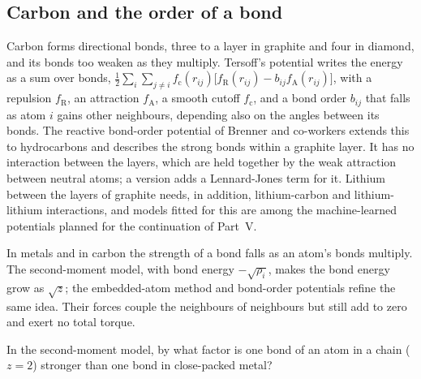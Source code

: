 \subsection*{Carbon and the order of a bond}

Carbon forms directional bonds, three to a layer in graphite and four in
diamond, and its bonds too weaken as they multiply. Tersoff's potential
writes the energy as a sum over bonds, $\frac12\sum_i\sum_{j\ne i}f_{\mathrm
c}(r_{ij})\bigl[f_{\mathrm R}(r_{ij}) - b_{ij}f_{\mathrm A}(r_{ij})
\bigr]$, with a repulsion $f_{\mathrm R}$, an attraction $f_{\mathrm A}$,
a smooth cutoff $f_{\mathrm c}$, and a bond order $b_{ij}$ that falls as
atom $i$ gains other neighbours, depending also on the angles between its
bonds\cite{Tersoff1988,Tersoff1988carbon}. The reactive bond-order potential of Brenner and
co-workers extends this to hydrocarbons and describes the strong bonds
within a graphite layer\cite{Brenner2002}. It has no interaction between
the layers, which are held together by the weak attraction between
neutral atoms; a version adds a Lennard-Jones term for
it\cite{Stuart2000}. Lithium between the layers of graphite needs, in
addition, lithium-carbon and lithium-lithium interactions, and models
fitted for this are among the machine-learned potentials planned for the
continuation of Part~V.

\begin{keyidea}
In metals and in carbon the strength of a bond falls as an atom's bonds
multiply. The second-moment model, with bond energy $-\sqrt{\rho_i}$,
makes the bond energy grow as $\sqrt{z}$; the embedded-atom method and
bond-order potentials refine the same idea. Their forces couple the
neighbours of neighbours but still add to zero and exert no total
torque.
\end{keyidea}


\begin{selfcheck}
In the second-moment model, by what factor is one bond of an atom in a
chain ($z = 2$) stronger than one bond in close-packed metal?
\end{selfcheck}
